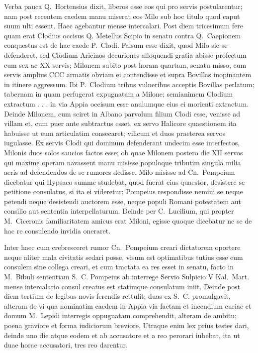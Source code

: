 Verba pauca Q.~Hortensius dixit, liberos esse eos qui pro servis postularentur; nam post recentem caedem manu miserat eos Milo sub hoc titulo quod caput suum ulti essent. Haec agebantur mense intercalari. Post diem tricesimum fere quam erat Clodius occisus Q. Metellus Scipio in senatu contra Q.~Caepionem conquestus est de hac caede P.~Clodi. Falsum esse dixit, quod Milo sic se defenderet, sed Clodium Aricinos decuriones alloquendi gratia abisse profectum cum sex ac XX servis; Milonem subito post horam quartam, senatu misso, cum servis amplius CCC armatis obviam ei contendisse et supra Bovillas inopinantem in itinere aggressum. Ibi P.~Clodium tribus vulneribus acceptis Bovillas perlatum; tabernam in quam perfugerat expugnatam a Milone; semianimem Clodium extractum . . . in via Appia occisum esse anulumque eius ei morienti extractum. Deinde Milonem, cum sciret in Albano parvolum filium Clodi esse, venisse ad villam et, cum puer ante subtractus esset, ex servo Halicore quaestionem ita habuisse ut eum articulatim consecaret; vilicum et duos praeterea servos iugulasse. Ex servis Clodi qui dominum defenderant undecim esse interfectos, Milonis duos solos saucios factos esse; ob quae Milonem postero die XII servos qui maxime operam navassent manu misisse populoque tributim singula milia aeris ad defendendos de se rumores dedisse. Milo misisse ad Cn.~Pompeium dicebatur qui Hypsaeo summe studebat, quod fuerat eius quaestor, desistere se petitione consulatus, si ita ei videretur; Pompeius respondisse nemini se neque petendi neque desistendi auctorem esse, neque populi Romani potestatem aut consilio aut sententia interpellaturum. Deinde per C.~Lucilium, qui propter M.~Ciceronis familiaritatem amicus erat Miloni, egisse quoque dicebatur ne se de hac re consulendo invidia oneraret.

Inter haec cum crebresceret rumor Cn.~Pompeium creari dictatorem oportere neque aliter mala civitatis sedari posse, visum est optimatibus tutius esse eum consulem sine collega creari, et cum tractata ea res esset in senatu, facto in M.~Bibuli sententiam S.~C. Pompeius ab interrege Servio Sulpicio V Kal.~Mart. mense intercalario consul creatus est statimque consulatum iniit. Deinde post diem tertium de legibus novis ferendis rettulit; duas ex S.~C. promulgavit, alteram de vi qua nominatim caedem in Appia via factam et incendium curiae et domum M.~Lepidi interregis oppugnatam comprehendit, alteram de ambitu; poena graviore et forma iudiciorum breviore. Utraque enim lex prius testes dari, deinde uno die atque eodem et ab accusatore et a reo perorari iubebat, ita ut duae horae accusatori, tres reo darentur. 

